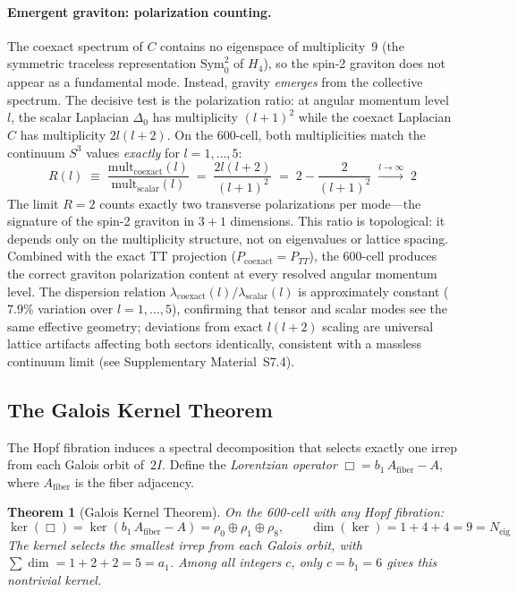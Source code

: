 \documentclass[12pt,a4paper]{article}
\newtheorem{theorem}{Theorem}
\theoremstyle{definition}
\begin{document}
\paragraph{Emergent graviton: polarization counting.}
The coexact spectrum of $C$ contains no eigenspace of multiplicity~9 (the symmetric traceless representation $\mathrm{Sym}^2_0$ of $H_4$), so the spin-2 graviton does not appear as a fundamental mode.  Instead, gravity \emph{emerges} from the collective spectrum.  The decisive test is the polarization ratio: at angular momentum level~$l$, the scalar Laplacian $\Delta_0$ has multiplicity $(l+1)^2$ while the coexact Laplacian $C$ has multiplicity $2l(l+2)$.  On the 600-cell, both multiplicities match the continuum $S^3$ values \emph{exactly} for $l = 1, \ldots, 5$:
\begin{equation}
R(l) \;\equiv\; \frac{\mathrm{mult}_{\mathrm{coexact}}(l)}{\mathrm{mult}_{\mathrm{scalar}}(l)} \;=\; \frac{2l(l+2)}{(l+1)^2} \;=\; 2 - \frac{2}{(l+1)^2} \;\xrightarrow{l\to\infty}\; 2
\label{eq:polarization_ratio}
\end{equation}
The limit $R = 2$ counts exactly two transverse polarizations per mode---the signature of the spin-2 graviton in $3\!+\!1$ dimensions.  This ratio is topological: it depends only on the multiplicity structure, not on eigenvalues or lattice spacing.  Combined with the exact TT projection ($P_{\mathrm{coexact}} = P_{TT}$), the 600-cell produces the correct graviton polarization content at every resolved angular momentum level.  The dispersion relation $\lambda_{\mathrm{coexact}}(l)/\lambda_{\mathrm{scalar}}(l)$ is approximately constant ($7.9\%$ variation over $l = 1, \ldots, 5$), confirming that tensor and scalar modes see the same effective geometry; deviations from exact $l(l+2)$ scaling are universal lattice artifacts affecting both sectors identically, consistent with a massless continuum limit (see Supplementary Material~S7.4).

\subsection{The Galois Kernel Theorem}
\label{sec:galois_kernel}

The Hopf fibration induces a spectral decomposition that selects exactly one irrep from each Galois orbit of~$2I$.  Define the \emph{Lorentzian operator} $\Box = b_1 \, A_{\text{fiber}} - A$, where $A_{\text{fiber}}$ is the fiber adjacency.

\begin{theorem}[Galois Kernel Theorem]\label{thm:galois_kernel}
On the 600-cell with any Hopf fibration:
\begin{equation}
\ker(\Box) = \ker(b_1\,A_{\mathrm{fiber}} - A) = \rho_0 \oplus \rho_1 \oplus \rho_8, \qquad
\dim(\ker) = 1 + 4 + 4 = 9 = N_{\mathrm{eig}}
\label{eq:galois_kernel}
\end{equation}
The kernel selects the smallest irrep from each Galois orbit, with $\sum \dim = 1+2+2 = 5 = a_1$.  Among all integers $c$, only $c = b_1 = 6$ gives this nontrivial kernel.
\end{theorem}
\end{document}
